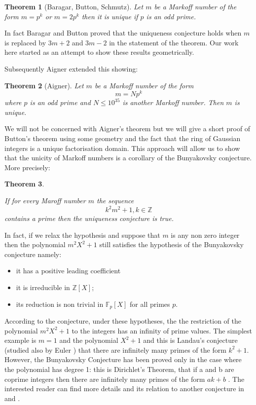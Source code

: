 \documentclass[12pt,a4paper]{amsart}
\newtheorem{thm}{Theorem}[section]
\def\ZZ{\mathbb{Z}}
\begin{document}
 \begin{thm}[Baragar, Button, Schmutz] \label{button}
 Let $m$ be a Markoff number of the form 
 $m=p^k$ or $m=2p^k$ then it is unique
if $p$ is an odd prime.
 \end{thm}

\noindent
 In fact Baragar and Button proved that the uniqueness conjecture holds 
 when $m$ is replaced by $3m+2$ and $3m-2$ in the statement of the theorem. Our
 work here started as an attempt to show these results geometrically.

Subsequently Aigner extended  this showing:
 
 \begin{thm}[Aigner]
 Let $m$ be a Markoff number of the form 
 $$m =Np^k$$
 where $p$ is an odd prime and $N \leq 10^{35}$ is another Markoff number. Then $m$ is unique.
 \end{thm}

We will not be concerned with Aigner's theorem but we will give a short proof
of Button's theorem using some geometry and the fact that the ring of Gaussian
integers is a unique factorisation domain. This approach will allow us to show
that the unicity of Markoff numbers is a corollary of the Bunyakovsky
conjecture. More precisely:

\begin{thm}\label{main}

If for every Maroff number $m$ the sequence $$k^2m^2 + 1, k \in \ZZ$$ contains a
prime then the uniqueness conjecture is true.

\end{thm}

In fact, if we relax the hypothesis and suppose that $m$ is any non zero
integer then the polynomial $m^2 X^2 + 1$ still satisfies the hypothesis of the
Bunyakovsky conjecture \cite{Bouniakowsky} namely:

\begin{itemize}
\item it has a positive leading coefficient
\item it is irreducible in  $\ZZ[X]$;
\item its reduction is non trivial in $\mathbb{F}_p[X]$ for all primes $p$.
\end{itemize}

\noindent According to the conjecture, under these hypotheses, the the
restriction of the polynomial  $m^2 X^2 + 1$ to the integers has an infinity of
prime values. The simplest example is $m=1$ and the polynomial $X^2 + 1$ and
this is Landau’s conjecture (studied also by Euler\cite{euler} ) that there are
infinitely many primes of the form $k^2 + 1$. However, the Bunyakovsky
Conjecture has been proved only in the case where the polynomial  has degree 1:
this is Dirichlet’s Theorem, that if a and b are coprime integers then there
are infinitely many primes of the form $ak + b$ . The interested reader can
find more details and its relation to another conjecture in \cite{Pollack} and
\cite{jones}.
\end{document}
